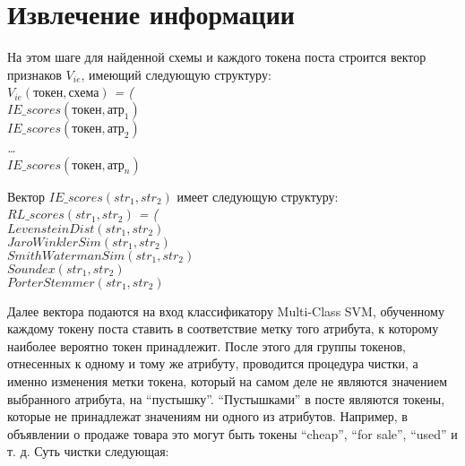 \section{Извлечение информации}

На этом шаге для найденной схемы и каждого токена поста строится вектор признаков $V_{ie}$, имеющий следующую структуру:\\

\noindent
\textit{$V_{ie}(\text{токен}, \text{схема})$ = (\\
\-\hspace{1cm}	$IE\_scores(\text{токен}, \text{атр}_1)$\\
\-\hspace{1cm}	$IE\_scores(\text{токен}, \text{атр}_2)$\\
\-\hspace{1cm}	\ldots\\
\-\hspace{1cm}	$IE\_scores(\text{токен}, \text{атр}_n)$\\
} %

Вектор $IE\_scores(str_1, str_2)$ имеет следующую структуру:\\

\noindent
\textit{$RL\_scores(str_1, str_2)$ = (\\
\-\hspace{1cm}	$LevensteinDist(str_1, str_2)$\\
\-\hspace{1cm}	$JaroWinklerSim(str_1, str_2)$\\
\-\hspace{1cm}	$SmithWatermanSim(str_1, str_2)$\\
\-\hspace{1cm}	$Soundex(str_1, str_2)$\\
\-\hspace{1cm}	$PorterStemmer(str_1, str_2)$\\
} %

Далее вектора подаются на вход классификатору Multi-Class SVM, обученному каждому токену поста ставить в соответствие метку того атрибута, к которому наиболее вероятно токен принадлежит. После этого для группы токенов, отнесенных к одному и тому же атрибуту, проводится процедура чистки, а именно изменения метки токена, который на самом деле не являются значением выбранного атрибута, на ``пустышку''. ``Пустышками'' в посте являются токены, которые не принадлежат значениям ни одного из атрибутов. Например, в объявлении о продаже товара это могут быть токены ``cheap'', ``for sale'', ``used'' и т. д. Суть чистки следующая:\\

